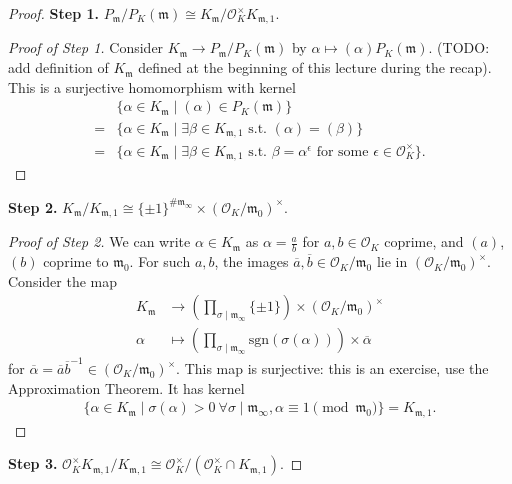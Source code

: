 \documentclass{article}
\theoremstyle{definition}
\begin{document}
\begin{proof}
    \textbf{Step 1.} $P_{\mathfrak{m}}/P_K(\mathfrak{m}) \cong K_{\mathfrak{m}}/\mathcal{O}_K^\times K_{\mathfrak{m},1}$.
    \begin{proof}[Proof of Step 1]
        Consider $K_{\mathfrak{m}} \to P_{\mathfrak{m}}/P_K(\mathfrak{m})$ by $\alpha \mapsto (\alpha)P_K(\mathfrak{m})$. (TODO: add definition of $K_{\mathfrak{m}}$ defined at the beginning of this lecture during the recap). This is a surjective homomorphism with kernel 
        \begin{align*}
            &\{\alpha \in K_{\mathfrak{m}}\mid  (\alpha) \in P_K(\mathfrak{m})\} \\
            =& \{\alpha \in K_{\mathfrak{m}} \mid \exists \beta \in K_{\mathfrak{m},1} \text{ s.t. }(\alpha)=(\beta)\} \\
            =& \{\alpha \in K_{\mathfrak{m}} \mid \exists \beta \in K_{\mathfrak{m},1} \text{ s.t. }\beta = \alpha^\epsilon \text{ for some }\epsilon \in \mathcal{O}_K^\times\}.
        \end{align*}
    \end{proof}
    \textbf{Step 2.} $K_{\mathfrak{m}}/K_{\mathfrak{m},1} \cong \{\pm 1\}^{\# \mathfrak{m}_{\infty}} \times (\mathcal{O}_K/\mathfrak{m}_0)^\times$.
    \begin{proof}[Proof of Step 2]
        We can write $\alpha \in K_{\mathfrak{m}}$ as $\alpha = \frac{a}{b}$ for $a,b \in \mathcal{O}_K$ coprime, and $(a)$, $(b)$ coprime to $\mathfrak{m}_0$. For such $a,b$, the images $\overline{a},\overline{b} \in \mathcal{O}_K/\mathfrak{m}_0$ lie in $(\mathcal{O}_K/\mathfrak{m}_0)^\times$. Consider the map 
        \begin{align*}
            K_{\mathfrak{m}} &\to \left( \prod_{\sigma \mid \mathfrak{m}_{\infty}}^{} \{\pm 1\}\right) \times (\mathcal{O}_K/\mathfrak{m}_0)^\times\\
            \alpha &\mapsto \left(\prod_{\sigma \mid \mathfrak{m}_{\infty}}^{} \text{sgn}(\sigma(\alpha)) \right) \times \overline{\alpha}
        \end{align*}
        for $\overline{\alpha} = \overline{a} \overline{b}^{-1} \in (\mathcal{O}_K/\mathfrak{m}_0)^\times$. This map is surjective: this is an exercise, use the Approximation Theorem. It has kernel 
        \begin{align*}
            \{\alpha \in K_{\mathfrak{m}}\mid \sigma(\alpha) > 0 ~\forall \sigma \mid \mathfrak{m}_{\infty}, \alpha \equiv 1 \pmod{\mathfrak{m}_0}\} = K_{\mathfrak{m},1}.
        \end{align*}
    \end{proof}
    \textbf{Step 3.} $\mathcal{O}_K^\times K_{\mathfrak{m},1}/K_{\mathfrak{m},1} \cong \mathcal{O}_K^\times/(\mathcal{O}_K^\times \cap K_{\mathfrak{m},1})$.
    \vspace{1mm}
     

\end{proof}
\end{document}

